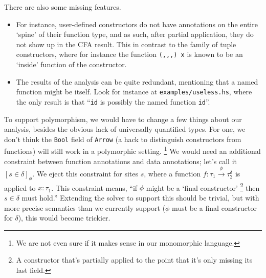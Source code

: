 \documentclass[a4paper]{scrartcl}
\begin{document}
There are also some missing features. 
\begin{itemize}
\item
    For instance, user-defined constructors do not have annotations on the entire
    `spine' of their function type, and as such, after partial application, they
    do not show up in the CFA result. This in contrast to the family of tuple
    constructors, where for instance the function \texttt{(,,,) x} is known to be
    an `inside' function of the constructor.
\item
    The results of the analysis can be quite redundant, mentioning that a named
    function might be itself. Look for instance at \texttt{examples/useless.hs},
    where the only result is that ``\texttt{id} is possibly the named function
    \texttt{id}''.
\end{itemize}

To support polymorphism, we would have to change a few things about our analysis,
besides the obvious lack of universally quantified types. For one, we don't
think the \texttt{Bool} field of \texttt{Arrow} (a hack to distinguish
constructors from functions) will still work in a polymorphic setting.%
\footnote{We are not even sure if it makes sense in our monomorphic language.}
We would need an additional constraint between function annotations and
data annotations; let's call it $[s \in \delta]_\phi$. We eject this constraint
for sites $s$, where a function $f : \tau_1 \xrightarrow{\phi} \tau_2^\delta$
is applied to $x : \tau_1$. This constraint means, ``if $\phi$ might be
a `final constructor'%
\footnote{A constructor that's partially applied to the point that it's only
missing its last field.}
then $s \in \delta$ must hold.'' Extending the solver to support this should be
trivial, but with more precise semantics than we currently support ($\phi$ must
be a final constructor for $\delta$), this would become trickier.
\end{document}
